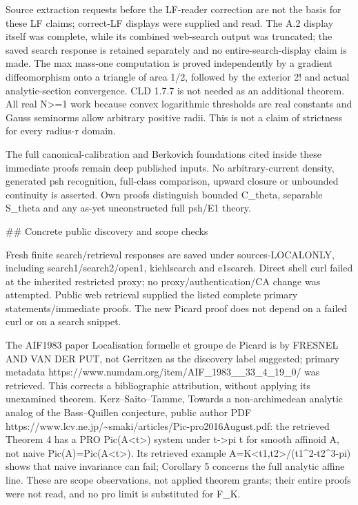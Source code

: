 \documentclass[11pt]{article}
\begin{document}
Source extraction requests before the LF-reader correction are not the basis for these LF claims; correct-LF displays were supplied and read. The A.2 display itself was complete, while its combined web-search output was truncated; the saved search response is retained separately and no entire-search-display claim is made. The max mass-one computation is proved independently by a gradient diffeomorphism onto a triangle of area 1/2, followed by the exterior 2! and actual analytic-section convergence. CLD 1.7.7 is not needed as an additional theorem. All real N>=1 work because convex logarithmic thresholds are real constants and Gauss seminorms allow arbitrary positive radii. This is not a claim of strictness for every radius-r domain.

The full canonical-calibration and Berkovich foundations cited inside these immediate proofs remain deep published inputs. No arbitrary-current density, generated psh recognition, full-class comparison, upward closure or unbounded continuity is asserted. Own proofs distinguish bounded C\_theta, separable S\_theta and any as-yet unconstructed full psh/E1 theory.

\#\# Concrete public discovery and scope checks

Fresh finite search/retrieval responses are saved under sources-LOCALONLY, including search1/search2/open1, kiehlsearch and e1search. Direct shell curl failed at the inherited restricted proxy; no proxy/authentication/CA change was attempted. Public web retrieval supplied the listed complete primary statements/immediate proofs. The new Picard proof does not depend on a failed curl or on a search snippet.

The AIF1983 paper Localisation formelle et groupe de Picard is by FRESNEL AND VAN DER PUT, not Gerritzen as the discovery label suggested; primary metadata https://www.numdam.org/item/AIF\_1983\_\_33\_4\_19\_0/ was retrieved. This corrects a bibliographic attribution, without applying its unexamined theorem. Kerz--Saito--Tamme, Towards a non-archimedean analytic analog of the Bass--Quillen conjecture, public author PDF https://www.lcv.ne.jp/\textasciitilde{}smaki/articles/Pic-pro2016August.pdf: the retrieved Theorem 4 has a PRO Pic(A<t>) system under t->pi t for smooth affinoid A, not naive Pic(A)=Pic(A<t>). Its retrieved example A=K<t1,t2>/(t1\textasciicircum{}2-t2\textasciicircum{}3-pi) shows that naive invariance can fail; Corollary 5 concerns the full analytic affine line. These are scope observations, not applied theorem grants; their entire proofs were not read, and no pro limit is substituted for F\_K.
\end{document}
